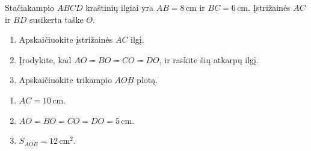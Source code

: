 \begin{salyga}
Stačiakampio $ABCD$ kraštinių ilgiai yra $AB=8\,\text{cm}$ ir
$BC=6\,\text{cm}$. Įstrižainės $AC$ ir $BD$ susikerta taške $O$.
\begin{center}
\end{center}
\begin{enumerate}[label=\alph*)]
  \item Apskaičiuokite įstrižainės $AC$ ilgį.
  \item Įrodykite, kad $AO=BO=CO=DO$, ir raskite šių atkarpų ilgį.
  \item Apskaičiuokite trikampio $AOB$ plotą.
\end{enumerate}
\end{salyga}

\begin{atsakymas}
\begin{enumerate}[label=\alph*)]
  \item $AC=10\,\text{cm}$.
  \item $AO=BO=CO=DO=5\,\text{cm}$.
  \item $S_{AOB}=12\,\text{cm}^2$.
\end{enumerate}
\end{atsakymas}

